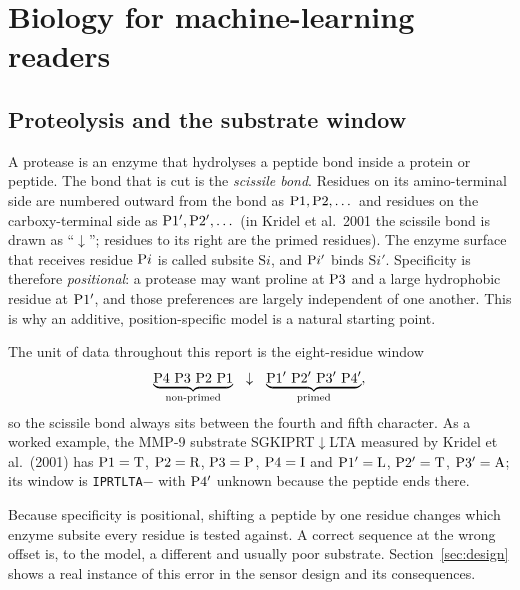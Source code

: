 \section{Biology for machine-learning readers}
\label{sec:bio}

\subsection{Proteolysis and the substrate window}
A protease is an enzyme that hydrolyses a peptide bond inside a protein or peptide. The bond that is cut is the \emph{scissile bond}. Residues on its amino-terminal side are numbered outward from the bond as $\mathrm{P}1,\mathrm{P}2,\dots$ and residues on the carboxy-terminal side as $\mathrm{P}1',\mathrm{P}2',\dots$ (in Kridel et al.\ 2001 the scissile bond is drawn as ``$\downarrow$''; residues to its right are the primed residues). The enzyme surface that receives residue $\mathrm{P}i$ is called subsite $\mathrm{S}i$, and $\mathrm{P}i'$ binds $\mathrm{S}i'$. Specificity is therefore \emph{positional}: a protease may want proline at $\mathrm{P}3$ and a large hydrophobic residue at $\mathrm{P}1'$, and those preferences are largely independent of one another. This is why an additive, position-specific model is a natural starting point.

The unit of data throughout this report is the eight-residue window
\[
\underbrace{\pos{4}\ \pos{3}\ \pos{2}\ \pos{1}}_{\text{non-primed}}\ \ \downarrow\ \ \underbrace{\prm{1}\ \prm{2}\ \prm{3}\ \prm{4}}_{\text{primed}},
\]
so the scissile bond always sits between the fourth and fifth character. As a worked example, the MMP-9 substrate SGKIPRT$\downarrow$LTA measured by Kridel et al.\ (2001) has $\mathrm{P}1=\mathrm{T}$, $\mathrm{P}2=\mathrm{R}$, $\mathrm{P}3=\mathrm{P}$, $\mathrm{P}4=\mathrm{I}$ and $\mathrm{P}1'=\mathrm{L}$, $\mathrm{P}2'=\mathrm{T}$, $\mathrm{P}3'=\mathrm{A}$; its window is \texttt{IPRTLTA}$-$ with $\mathrm{P}4'$ unknown because the peptide ends there.

\begin{bionote}
Because specificity is positional, shifting a peptide by one residue changes which enzyme subsite every residue is tested against. A correct sequence at the wrong offset is, to the model, a different and usually poor substrate. Section~\ref{sec:design} shows a real instance of this error in the sensor design and its consequences.
\end{bionote}

